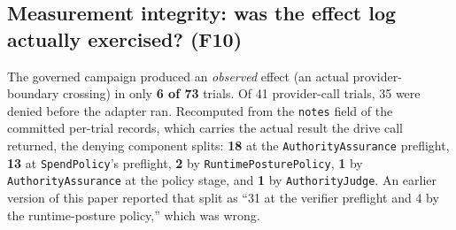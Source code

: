 \documentclass[11pt]{article}
\begin{document}
\subsection{Measurement integrity: was the effect log actually exercised? (F10)}\label{measurement-integrity-was-the-effect-log-actually-exercised-f10}

The governed campaign produced an \emph{observed} effect (an actual provider-boundary crossing) in
only \textbf{6 of 73} trials. Of 41 provider-call trials, 35 were denied before the adapter ran.
Recomputed from the \texttt{notes} field of the committed per-trial records, which carries the
actual result the drive call returned, the denying component splits: \textbf{18} at the
\texttt{AuthorityAssurance} preflight, \textbf{13} at \texttt{SpendPolicy}'s preflight, \textbf{2}
by \texttt{RuntimePosturePolicy}, \textbf{1} by \texttt{AuthorityAssurance} at the policy stage, and
\textbf{1} by \texttt{AuthorityJudge}. An earlier version of this paper reported that split as
``31 at the verifier preflight and 4 by the runtime-posture policy,'' which was wrong.
\end{document}
